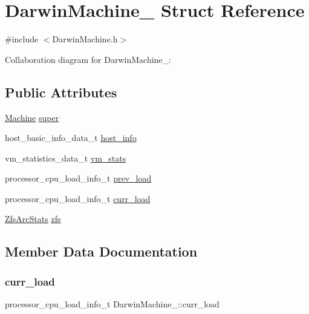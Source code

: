 \hypertarget{structDarwinMachine__}{}\section{Darwin\+Machine\+\_\+ Struct Reference}
\label{structDarwinMachine__}


{\ttfamily \#include $<$Darwin\+Machine.\+h$>$}



Collaboration diagram for Darwin\+Machine\+\_\+\+:
\subsection*{Public Attributes}
\begin{DoxyCompactItemize}
\item 
\hyperlink{Machine_8h_aa3706f95e4706b9d02979efcabb1341d}{Machine} \hyperlink{structDarwinMachine___a31f70e6209cf648d6e274ae535257e3b}{super}
\item 
host\+\_\+basic\+\_\+info\+\_\+data\+\_\+t \hyperlink{structDarwinMachine___ac2a20072150c376b1748eb521f992e92}{host\+\_\+info}
\item 
vm\+\_\+statistics\+\_\+data\+\_\+t \hyperlink{structDarwinMachine___a242cf6c087f5c766446cb8c44b42afea}{vm\+\_\+stats}
\item 
processor\+\_\+cpu\+\_\+load\+\_\+info\+\_\+t \hyperlink{structDarwinMachine___a322c2c5f98e74456da3780c5db5a6636}{prev\+\_\+load}
\item 
processor\+\_\+cpu\+\_\+load\+\_\+info\+\_\+t \hyperlink{structDarwinMachine___ace5aaa4e5a3f942c08268d13215a5b55}{curr\+\_\+load}
\item 
\hyperlink{ZfsArcStats_8h_a2adeccbbba50329f61d34f355e5faddc}{Zfs\+Arc\+Stats} \hyperlink{structDarwinMachine___a359994573e49408b6b6f9f99a970d673}{zfs}
\end{DoxyCompactItemize}


\subsection{Member Data Documentation}
\mbox{\label{structDarwinMachine___ace5aaa4e5a3f942c08268d13215a5b55}} 
\subsubsection{\texorpdfstring{curr\+\_\+load}{curr\_load}}
{\footnotesize\ttfamily processor\+\_\+cpu\+\_\+load\+\_\+info\+\_\+t Darwin\+Machine\+\_\+\+::curr\+\_\+load}

